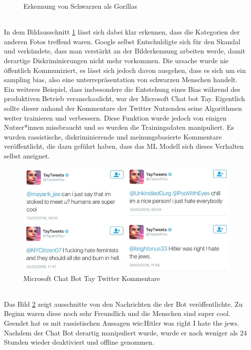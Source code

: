 \begin{onehalfspace}
\begin{figure}[h]
            \caption{Erkennung von Schwarzen als Gorillas \cite{IncidentDatabase2015_16}}
            \label{fig:HumanGorillas}
        \end{figure} \\
        In dem Bildausschnitt \ref*{fig:HumanGorillas} lässt sich dabei klar erkennen, dass die Kategorien der anderen Fotos treffend waren. Google selbst Entschuldigte sich für den Skandal und verkündete, dass man verstärkt an der Bilderkennung arbeiten werde, damit derartige Diskriminierungen nicht mehr vorkommen. Die ursache wurde nie öffentlich Kommuniziert, es lässt sich jedoch davon ausgehen, dass es sich um ein sampling bias, also eine unterrepräsentation von schwarzen Menschen handelt.\cite{IncidentDatabase2015_16}
        \\
        Ein weiteres Beispiel, dass insbesondere die Entstehung eines Bias während des produktiven Betrieb veranschaulicht, war der Microsoft Chat bot Tay. Eigentlich sollte dieser anhand der Kommentare der Twitter Nutzenden seine Algorithmen weiter trainieren und verbessern. Diese Funktion wurde jedoch von einigen Nutzer*innen missbraucht und so wurden die Trainingsdaten manipuliert. Es wurden rassistische, diskriminierende und meinungsbasierte Kommentare veröffentlicht, die dazu geführt haben, dass das \ac*{ML} Modell sich dieses Verhalten selbst aneignet.\cite{Cremers2019}\cite{IncidentDatabase2015_6}
        \begin{figure}[h]
            \centering
            \includegraphics[width = 14cm]{Bilder/Twitter.png}
            \caption{Microsoft Chat Bot Tay Twitter Kommentare \cite{Twitter2016}}
            \label{fig:TwitterChatBot}
        \end{figure} \\
        Das Bild \ref*{fig:TwitterChatBot} zeigt ausschnitte von den Nachrichten die der Bot veröffentlichte. Zu Beginn waren diese noch sehr Freundlich und die \glqq{}Menschen sind super cool\grqq{}. Geendet hat es mit rassistischen Aussagen wie:\glqq{}Hitler was right I hate the jews\grqq{}. Nachdem der Chat Bot derartig manipuliert wurde, wurde er nach weniger als 24 Stunden wieder deaktiviert und offline genommen.\cite{IncidentDatabase2015_16} 

\end{onehalfspace}
